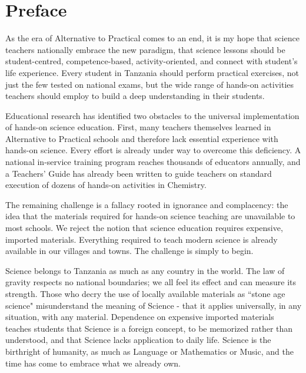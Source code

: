 \chapter*{Preface}

As the era of Alternative to Practical comes to an end, it is my hope that science teachers nationally embrace the new paradigm, that  science lessons should be student-centred, competence-based, activity-oriented, and connect with student's life experience. Every student in Tanzania should perform practical exercises, not just the few tested on national exams, but the wide range of hands-on activities teachers should employ to build a deep understanding in their students.

Educational research has identified two obstacles to the universal implementation of hands-on science education. First, many teachers themselves learned in Alternative to Practical schools and therefore lack essential experience with hands-on science. Every effort is already under way to overcome this deficiency. A national in-service training program reaches thousands of educators annually, and a Teachers' Guide has already been written to guide teachers on  standard execution of dozens of hands-on activities in Chemistry.

The remaining challenge is a fallacy rooted in ignorance and complacency: the idea that the materials required for hands-on science teaching are unavailable to most schools. We reject the notion that science education requires expensive, imported materials. Everything required to teach modern science is already available in our villages and towns. The challenge is simply to begin.

Science belongs to Tanzania as much as any country in the world. The law of gravity respects no national boundaries; we all feel its effect and can measure its strength. Those who decry the use of locally available materials as ``stone age science" misunderstand the meaning 
of Science - that it applies universally, in any situation, with any material. Dependence on expensive imported materials teaches students that Science is a foreign concept, to be memorized rather than understood, and that Science lacks application to daily life. Science is the birthright of humanity, as much as Language or Mathematics or Music, and the time has come to embrace what we already own.

